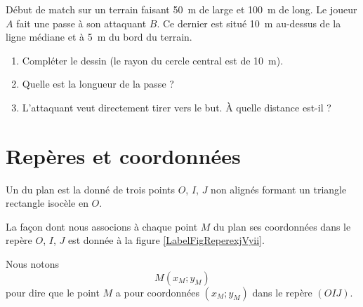
Début de match sur un terrain faisant \SI{50}{\meter} de large et \SI{100}{\meter} de long. Le joueur \( A\) fait une passe à son attaquant \( B\). Ce dernier est situé \SI{10}{\meter} au-dessus de la ligne médiane et à \SI{5}{\meter} du bord du terrain.

\begin{center}
   
\end{center}

\begin{enumerate}
    \item
        Compléter le dessin (le rayon du cercle central est de \SI{10}{\meter}).
    \item
        Quelle est la longueur de la passe ?
    \item
        L'attaquant veut directement tirer vers le but. À quelle distance est-il ?
\end{enumerate}

\section{Repères et coordonnées}

\begin{definition}
    Un  du plan est la donné de trois points \( O\), \( I\), \( J\) non alignés formant un triangle rectangle isocèle en  \( O\).
\end{definition}

La façon dont nous associons à chaque point \( M\) du plan ses coordonnées dans le repère \( O\), \( I\), \( J\) est donnée à la figure \ref{LabelFigReperexjVyii}.
\newcommand{\CaptionFigReperexjVyii}{Lire les coordonnées du point \( M\) dans le repère \( OIJ\).}


Nous notons 
\begin{equation}
    M(x_M;y_M)
\end{equation}
pour dire que le point \( M\) a pour coordonnées \( (x_M;y_M)\) dans le repère \( (OIJ)\).


